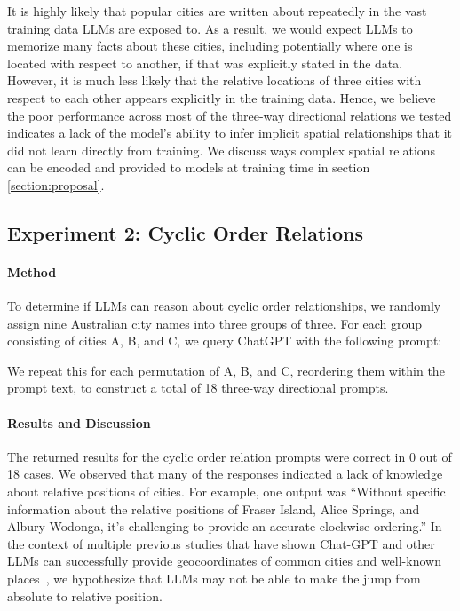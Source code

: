 It is highly likely that popular cities are written about repeatedly in the vast training data LLMs are exposed to.
As a result, we would expect LLMs to memorize many facts about these cities, including potentially where one is located with respect to another, if that was explicitly stated in the data.
However, it is much less likely that the relative locations of three cities with respect to each other appears explicitly in the training data.
Hence, we believe the poor performance across most of the three-way directional relations we tested indicates a lack of the model's ability to infer implicit spatial relationships that it did not learn directly from training.
We discuss ways complex spatial relations can be encoded and provided to models at training time in section \ref{section:proposal}.


\subsection{Experiment 2: Cyclic Order Relations}
\paragraph{Method}
To determine if LLMs can reason about cyclic order relationships, we randomly assign nine Australian city names into three groups of three.
For each group consisting of cities A, B, and C, we query ChatGPT with the following prompt: 
\begin{center}
\end{center}
We repeat this for each permutation of A, B, and C, reordering them within the prompt text, to construct a total of 18 three-way directional prompts.

\paragraph{Results and Discussion}
The returned results for the cyclic order relation prompts were correct in 0 out of 18 cases.
We observed that many of the responses indicated a lack of knowledge about relative positions of cities.
For example, one output was 
``Without specific information about the relative positions of Fraser Island, Alice Springs, and Albury-Wodonga, it's challenging to provide an accurate clockwise ordering.''
In the context of multiple previous studies that have shown Chat-GPT and other LLMs can successfully provide geocoordinates of common cities and well-known places~\cite{Bhandari2023,Qi2023}, we hypothesize that LLMs may not be able to make the jump from absolute to relative position. 


